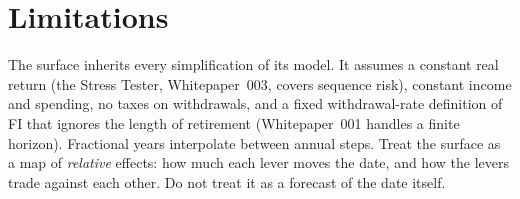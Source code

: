 \documentclass[11pt,letterpaper]{article}
\begin{document}
\section{Limitations}

The surface inherits every simplification of its model. It assumes a constant real return (the Stress Tester, Whitepaper~003, covers sequence risk), constant income and spending, no taxes on withdrawals, and a fixed withdrawal-rate definition of FI that ignores the length of retirement (Whitepaper~001 handles a finite horizon). Fractional years interpolate between annual steps. Treat the surface as a map of \emph{relative} effects: how much each lever moves the date, and how the levers trade against each other. Do not treat it as a forecast of the date itself.
\end{document}

